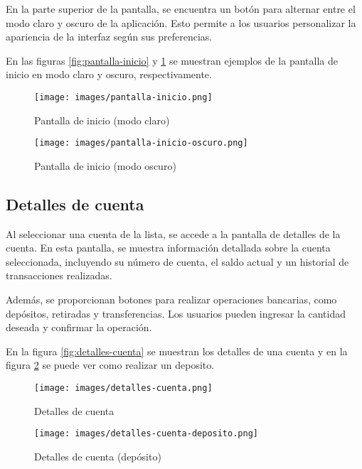 \documentclass[12pt]{article}
\begin{document}
En la parte superior de la pantalla, se encuentra un botón para alternar entre el modo claro y oscuro de la aplicación. Esto permite a los usuarios personalizar la apariencia de la interfaz según sus preferencias.

En las figuras \ref{fig:pantalla-inicio} y \ref{fig:pantalla-inicio-oscuro} se muestran ejemplos de la pantalla de inicio en modo claro y oscuro, respectivamente.

\begin{figure}[H]
    \centering
    \begin{minipage}[b]{0.48\textwidth}
        \centering
        \texttt{[image: images/pantalla-inicio.png]}
        \caption{Pantalla de inicio (modo claro)}
        \label{fig:pantalla-inicio}
    \end{minipage}
    \hfill
    \begin{minipage}[b]{0.48\textwidth}
        \centering
        \texttt{[image: images/pantalla-inicio-oscuro.png]}
        \caption{Pantalla de inicio (modo oscuro)}
        \label{fig:pantalla-inicio-oscuro}
    \end{minipage}
\end{figure}

\subsection{Detalles de cuenta}

Al seleccionar una cuenta de la lista, se accede a la pantalla de detalles de la cuenta. En esta pantalla, se muestra información detallada sobre la cuenta seleccionada, incluyendo su número de cuenta, el saldo actual y un historial de transacciones realizadas.

Además, se proporcionan botones para realizar operaciones bancarias, como depósitos, retiradas y transferencias. Los usuarios pueden ingresar la cantidad deseada y confirmar la operación.

En la figura \ref{fig:detalles-cuenta} se muestran los detalles de una cuenta y en la figura \ref{fig:detalles-cuenta-deposito} se puede ver como realizar un deposito.

\begin{figure}[H]
    \centering
    \begin{minipage}[b]{0.48\textwidth}
        \centering
        \texttt{[image: images/detalles-cuenta.png]}
        \caption{Detalles de cuenta}
        \label{fig:detalles-cuenta}
    \end{minipage}
    \hfill
    \begin{minipage}[b]{0.48\textwidth}
        \centering
        \texttt{[image: images/detalles-cuenta-deposito.png]}
        \caption{Detalles de cuenta (depósito)}
        \label{fig:detalles-cuenta-deposito}
    \end{minipage}
\end{figure}
\end{document}
